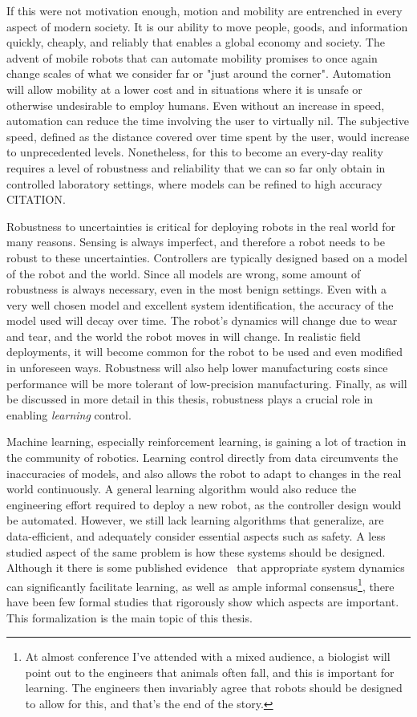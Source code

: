 If this were not motivation enough, motion and mobility are entrenched in every aspect of modern society. It is our ability to move people, goods, and information quickly, cheaply, and reliably that enables a global economy and society. The advent of mobile robots that can automate mobility promises to once again change scales of what we consider far or "just around the corner". Automation will allow mobility at a lower cost and in situations where it is unsafe or otherwise undesirable to employ humans. Even without an increase in speed, automation can reduce the time involving the user to virtually nil. The subjective speed, defined as the distance covered over time spent by the user, would increase to unprecedented levels. Nonetheless, for this to become an every-day reality requires a level of robustness and reliability that we can so far only obtain in controlled laboratory settings, where models can be refined to high accuracy CITATION. \par

Robustness to uncertainties is critical for deploying robots in the real world for many reasons.
Sensing is always imperfect, and therefore a robot needs to be robust to these uncertainties.
Controllers are typically designed based on a model of the robot and the world. Since all models are wrong, some amount of robustness is always necessary, even in the most benign settings.
Even with a very well chosen model and excellent system identification, the accuracy of the model used will decay over time.
The robot's dynamics will change due to wear and tear, and the world the robot moves in will change.
In realistic field deployments, it will become common for the robot to be used and even modified in unforeseen ways.
Robustness will also help lower manufacturing costs since performance will be more tolerant of low-precision manufacturing.
Finally, as will be discussed in more detail in this thesis, robustness plays a crucial role in enabling \emph{learning} control.
\par
Machine learning, especially reinforcement learning, is gaining a lot of traction in the community of robotics. Learning control directly from data circumvents the inaccuracies of models, and also allows the robot to adapt to changes in the real world continuously.
A general learning algorithm would also reduce the engineering effort required to deploy a new robot, as the controller design would be automated.
However, we still lack learning algorithms that generalize, are data-efficient, and adequately consider essential aspects such as safety.
A less studied aspect of the same problem is how these systems should be designed. Although it there is some published evidence~\cite{tedrake2005learning, randlov2000shaping} that appropriate system dynamics can significantly facilitate learning, as well as ample informal consensus\footnote{At almost conference I've attended with a mixed audience, a biologist will point out to the engineers that animals often fall, and this is important for learning. The engineers then invariably agree that robots should be designed to allow for this, and that's the end of the story.}, there have been few formal studies that rigorously show which aspects are important. This formalization is the main topic of this thesis.

